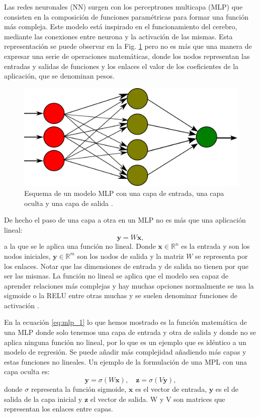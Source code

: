\documentclass[a4paper,12pt,twoside,titlepage]{article}
\begin{document}
Las redes neuronales (NN) surgen con los perceptrones multicapa (MLP) que consisten en la composición de funciones paramétricas para formar una función más compleja. Este modelo está inspirado en el funcionamiento del cerebro, mediante las conexiones entre neurona y la activación de las mismas. Esta representación se puede observar en la Fig. \ref{fig:mlp} pero no es más que una manera de expresar una serie de operaciones matemáticas, donde los nodos representan las entradas y salidas de funciones y los enlaces el valor de los coeficientes de la aplicación, que se denominan pesos. 
\begin{figure}[h!]
  \centering
  \includegraphics[scale=0.29]{MultiLayerPerceptron.png}
  \caption{Esquema de un modelo MLP con una capa de entrada, una capa oculta y una capa de salida \cite{mlp}.}
  \label{fig:mlp}
\end{figure}

De hecho el paso de una capa a otra en un MLP no es más que una aplicación lineal:
\begin{equation}
  \label{eq:mlp_1}
  \mathbf{y} = W\mathbf{x},
\end{equation}
a la que se le aplica una función no lineal. Donde $\mathbf{x} \in \mathbb{R}^n $ es la entrada y son los nodos iniciales, $\mathbf{y} \in \mathbb{R}^m$ son los nodos de salida y la matriz $W$ se representa por los enlaces. Notar que las dimensiones de entrada y de salida no tienen por que ser las mismas. La función no lineal se aplica que el modelo sea capaz de aprender relaciones más complejas y hay muchas opciones normalmente se usa la sigmoide o la RELU entre otras muchas y se suelen denominar funciones de activación \cite{dl_book}.

En la ecuación \ref{eq:mlp_1} lo que hemos mostrado es la función matemática de una MLP donde solo tenemos una capa de entrada y otra de salida y donde no se aplica ninguna función no lineal, por lo que es un ejemplo que es idéntico a un modelo de regresión. Se puede añadir más complejidad añadiendo más capas y estas funciones no lineales. Un ejemplo de la formulación de una MPL con una capa oculta es:
\begin{equation}
  \mathbf{y} = \sigma(W\mathbf{x}), \quad \mathbf{z} = \sigma(V\mathbf{y}),
\end{equation}
donde $\sigma$ representa la función sigmoide, $\mathbf{x}$ es el vector de entrada, $\mathbf{y}$ es el de salida de la capa inicial y $\mathbf{z}$ el vector de salida. W y V son matrices que representan los enlaces entre capas.
\end{document}
